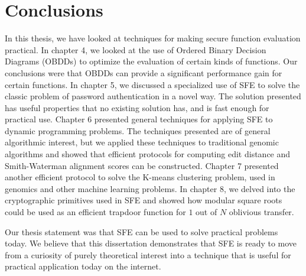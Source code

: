 \chapter{Conclusions}
In this thesis, we have looked at techniques for making secure function
evaluation practical. In chapter 4, we looked at the use of Ordered
Binary Decision Diagrams (OBDDs) to optimize the evaluation of certain
kinds of functions. Our conclusions were that OBDDs can provide a
significant performance gain for certain functions. In chapter 5,
we discussed a specialized use of SFE to solve the classic problem
of password authentication in a novel way. The solution presented
has useful properties that no existing solution has, and is fast enough
for practical use. Chapter 6 presented general techniques for applying
SFE to dynamic programming problems. The techniques presented are
of general algorithmic interest, but we applied these techniques to
traditional genomic algorithms and showed that efficient protocols
for computing edit distance and Smith-Waterman alignment scores can
be constructed. Chapter 7 presented another efficient protocol to
solve the K-means clustering problem, used in genomics and other machine
learning problems. In chapter 8, we delved into the cryptographic
primitives used in SFE and showed how modular square roots could be
used as an efficient trapdoor function for $1$ out of $N$ oblivious
transfer.

Our thesis statement was that SFE can be used to solve practical problems
today. We believe that this dissertation demonstrates that
SFE is ready to move from a curiosity of purely theoretical interest
into a technique that is useful for practical application today on
the internet.

